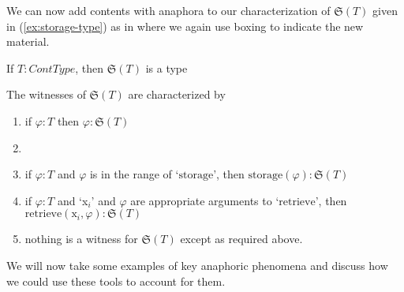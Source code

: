 We can now add contents with anaphora to
our characterization of $\mathfrak{S}(T)$ given in
(\ref{ex:storage-type}) as in \nexteg{} where we again use boxing to
indicate the new material.
\begin{ex} 
\begin{subex} 
 
\item If $T:\textit{ContType}$, then $\mathfrak{S}(T)$ is a type 
 
\item The witnesses of $\mathfrak{S}(T)$ are characterized by
  \begin{enumerate} 
 
  \item if $\varphi:T$ then $\varphi:\mathfrak{S}(T)$

    
  \item {}
 
  \item if $\varphi:T$ and $\varphi$ is in the range of `$\mathrm{storage}$', then
    $\mathrm{storage}(\varphi):\mathfrak{S}(T)$

  \item if $\varphi:T$ and `x$_i$' and $\varphi$ are appropriate
    arguments to `$\mathrm{retrieve}$', then
    $\mathrm{retrieve}(\text{x}_i,\varphi):\mathfrak{S}(T)$
    
  \item nothing is a witness for $\mathfrak{S}(T)$ except as required above.
 
  \end{enumerate} 
  
 
\end{subex} 
\label{ex:storage-anaph-type}   
\end{ex}

We will now take some examples of key anaphoric phenomena and discuss
how we could use these tools to account for them.




